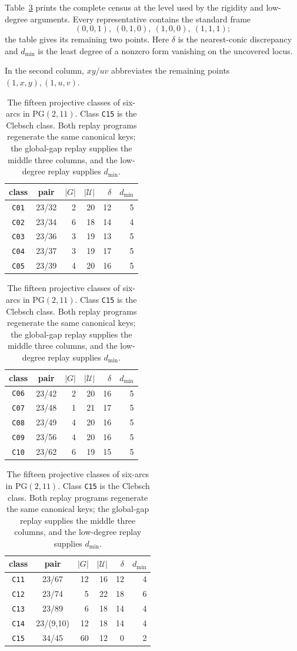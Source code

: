 \documentclass[11pt]{article}
\theoremstyle{definition}
\theoremstyle{remark}
\newcommand{\PG}{\mathrm{PG}}
\newcommand{\cU}{\mathcal{U}}
\begin{document}
Table~\ref{tab:fifteen-classes} prints the complete census at the level
used by the rigidity and low-degree arguments.  Every representative
contains the standard frame
\[
 (0,0,1),\ (0,1,0),\ (1,0,0),\ (1,1,1);
\]
the table gives its remaining two points.  Here $\delta$ is the
nearest-conic discrepancy and $d_{\min}$ is the least degree of a nonzero
form vanishing on the uncovered locus.

\begin{table}[H]
\centering
\scriptsize
In the second column, \(xy/uv\) abbreviates the remaining points
\((1,x,y),(1,u,v)\).
\smallskip

\begin{tabular}{@{}c c r r r r@{}}
\toprule
class & pair & $|G|$ & $|\cU|$ & $\delta$ & $d_{\min}$\\
\midrule
\texttt{C01}&23/32& 2&20&12&5\\
\texttt{C02}&23/34& 6&18&14&4\\
\texttt{C03}&23/36& 3&19&13&5\\
\texttt{C04}&23/37& 3&19&17&5\\
\texttt{C05}&23/39& 4&20&16&5\\
\bottomrule
\end{tabular}
\hfill
\begin{tabular}{@{}c c r r r r@{}}
\toprule
class & pair & $|G|$ & $|\cU|$ & $\delta$ & $d_{\min}$\\
\midrule
\texttt{C06}&23/42& 2&20&16&5\\
\texttt{C07}&23/48& 1&21&17&5\\
\texttt{C08}&23/49& 4&20&16&5\\
\texttt{C09}&23/56& 4&20&16&5\\
\texttt{C10}&23/62& 6&19&15&5\\
\bottomrule
\end{tabular}
\hfill
\begin{tabular}{@{}c c r r r r@{}}
\toprule
class & pair & $|G|$ & $|\cU|$ & $\delta$ & $d_{\min}$\\
\midrule
\texttt{C11}&23/67&12&16&12&4\\
\texttt{C12}&23/74& 5&22&18&6\\
\texttt{C13}&23/89& 6&18&14&4\\
\texttt{C14}&23/(9,10)&12&18&14&4\\
\texttt{C15}&34/45&60&12& 0&2\\
\bottomrule
\end{tabular}
\caption{The fifteen projective classes of six-arcs in $\PG(2,11)$.
Class \texttt{C15} is the Clebsch class.  Both replay programs regenerate
the same canonical keys; the global-gap replay supplies the middle three
columns, and the low-degree replay supplies $d_{\min}$.}
\label{tab:fifteen-classes}
\end{table}
\end{document}
